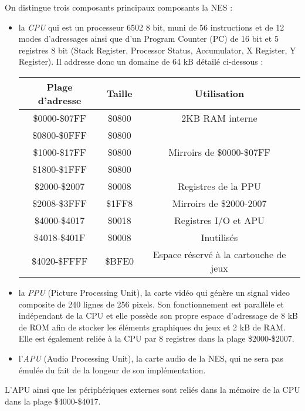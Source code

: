 On distingue trois composants principaux composants la NES :
\begin{itemize}
\item la \emph{CPU} qui est un processeur 6502 8 bit, muni de 56 instructions et de 12 modes d'adressages ainsi que d'un Program Counter (PC) de 16 bit et 5 registres 8 bit (Stack Register, Processor Status, Accumulator, X Register, Y Register). Il addresse donc un domaine de 64 kB détailé ci-dessous :

\hspace{1pt}

\begin{center}
\begin{tabular}{|c|c|c|}
  \hline
  Plage d'adresse & Taille & Utilisation \\
  \hline
  \$0000-\$07FF & \$0800 & 2KB RAM interne\\
  \hline
  \$0800-\$0FFF & \$0800 & \\
  \$1000-\$17FF & \$0800 & Mirroirs de \$0000-\$07FF\\
  \$1800-\$1FFF & \$0800 & \\
  \hline
  \$2000-\$2007 & \$0008 & Registres de la PPU \\
  \hline
  \$2008-\$3FFF & \$1FF8 & Mirroirs de \$2000-2007 \\
  \hline
  \$4000-\$4017 & \$0018 & Registres I/O et APU \\
  \hline
  \$4018-\$401F & \$0008 & Inutilisés \\
  \hline
  \$4020-\$FFFF & \$BFE0 & Espace réservé à la cartouche de jeux \\
  \hline
\end{tabular}
\end{center}
\hspace{1pt}

\item la \emph{PPU} (Picture Processing Unit), la carte vidéo qui génère un signal video composite de 240 lignes de 256 pixels. Son fonctionnement est parallèle et indépendant de la CPU et elle possède son propre espace d'adressage de 8 kB de ROM afin de stocker les éléments graphiques du jeux et 2 kB de RAM. Elle est également reliée à la CPU par 8 registres dans la plage \$2000-\$2007.
\item l'\emph{APU} (Audio Processing Unit), la carte audio de la NES, qui ne sera pas émulée du fait de la longeur de son implémentation.
\end{itemize}

L'APU ainsi que les périphériques externes sont reliés dans la mémoire de la CPU dans la plage \$4000-\$4017.

